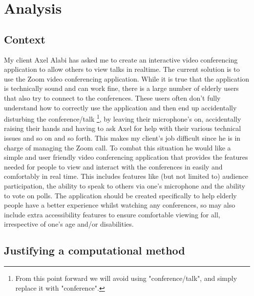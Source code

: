 \pagestyle{fancy}
\chead{\mdseries \thepage}

\chapter{Analysis}

\section{Context}
\label{sec:context}

My client Axel Alabi has asked me to create an interactive
video conferencing application to allow others to view talks 
in realtime. The current solution is to use the Zoom 
video conferencing application. While it is true that the 
application is technically sound and can work fine, there is a
large number of elderly users that also try to connect to the 
conferences. These users often don't fully understand how to 
correctly use the application and then end up accidentally 
disturbing the conference/talk \footnote{From this point 
forward we will avoid using "conference/talk", and simply
replace it with "conference".}, by leaving their microphone's
on, accidentally raising their hands and having to ask Axel
for help with their various technical issues and so on and so
forth. This makes my client's job difficult since he is in 
charge of managing the Zoom call. To combat this situation 
he would like a simple and user friendly video conferencing 
application that provides the features needed for people to 
view and interact with the conferences in easily and
comfortably in real time. This includes 
features like (but not limited to) audience participation,
the ability to speak to others via one's microphone and the
ability to vote on polls. The application should be
created specifically to help elderly people have a better 
experience whilst watching any conferences, so may also
include extra accessibility features to ensure comfortable
viewing for all, irrespective of one's age and/or disabilities.

\section{Justifying a computational method}
\label{sec:computational}

